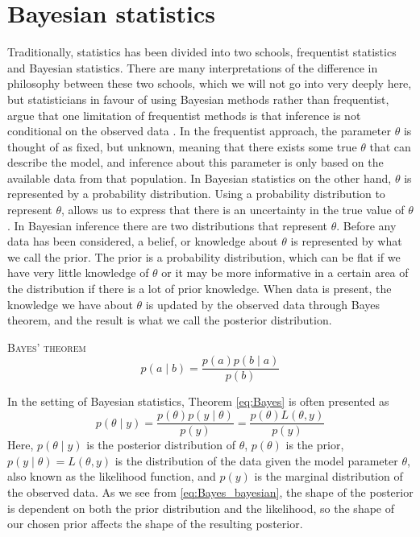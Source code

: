 \section{Bayesian statistics}\label{sec:bayesian}
Traditionally, statistics has been divided into two schools, frequentist statistics and Bayesian statistics. 
There are many interpretations of the difference in philosophy between these two schools, which we will not go into very deeply here, but statisticians in favour of using Bayesian methods rather than frequentist, argue that one limitation of frequentist methods is that inference is not conditional on the observed data \cite{Wagenmakers}. 
In the frequentist approach, the parameter $\theta$ is thought of as fixed, but unknown, meaning that there exists some true $\theta$ that can describe the model, and inference about this parameter is only based on the available data from that population. 
In Bayesian statistics on the other hand, $\theta$ is represented by a probability distribution. Using a probability distribution to represent $\theta$, allows us to express that there is an uncertainty in the true value of $\theta$. In Bayesian inference there are two distributions that represent $\theta$.  
Before any data has been considered, a belief, or knowledge about $\theta$ is represented by what we call the prior\cite{SI}. The prior is  a probability distribution, which can be flat if we have very little knowledge of $\theta$ or it may be more informative in a certain area of the distribution if there is a lot of prior knowledge. 
When data is present, the knowledge we have about $\theta$ is updated by the observed data through Bayes theorem, and the result is what we call the posterior distribution. 
\begin{theorem}{\textsc{Bayes' theorem}}\label{eq:Bayes}
\vspace{1em}
\begin{equation}
    p\left(a\mid b \right) = \frac{p\left(a\right)p\left(b\mid a \right)}{p\left(b\right)}
\end{equation}
\end{theorem} In the setting of Bayesian statistics, Theorem \ref{eq:Bayes} is often presented as
\begin{equation}\label{eq:Bayes_bayesian}
p\left(\theta\mid y\right) = \frac{p\left(\theta\right)p\left(y\mid\theta\right)}{p\left(y\right)} = \frac{p\left(\theta\right)L\left(\theta, y\right)}{p\left(y\right)}
\end{equation}
Here, $p\left(\theta\mid y \right)$ is the posterior distribution of $\theta$, $p\left(\theta\right)$ is the prior, $p\left(y\mid\theta\right) = L\left(\theta, y\right)$ is the distribution of the data given the model parameter $\theta$, also known as the likelihood function, and $p\left(y\right)$ is the marginal distribution of the observed data.  As we see from \eqref{eq:Bayes_bayesian}, the shape of the posterior is dependent on both the prior distribution and the likelihood, so the shape of our chosen prior affects the shape of the resulting posterior. 
